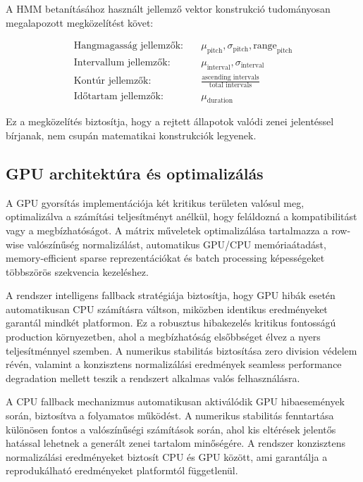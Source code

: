A HMM betanításához használt jellemző vektor konstrukció tudományosan megalapozott megközelítést követ:

\begin{align}
\text{Hangmagasság jellemzők:} \quad &\mu_{\text{pitch}}, \sigma_{\text{pitch}}, \text{range}_{\text{pitch}} \\
\text{Intervallum jellemzők:} \quad &\mu_{\text{interval}}, \sigma_{\text{interval}} \\
\text{Kontúr jellemzők:} \quad &\frac{\text{ascending intervals}}{\text{total intervals}} \\
\text{Időtartam jellemzők:} \quad &\mu_{\text{duration}}
\end{align}

Ez a megközelítés biztosítja, hogy a rejtett állapotok valódi zenei jelentéssel bírjanak, nem csupán matematikai konstrukciók legyenek.

\subsection{GPU architektúra és optimalizálás}

A GPU gyorsítás implementációja két kritikus területen valósul meg, optimalizálva a számítási teljesítményt anélkül, hogy feláldozná a kompatibilitást vagy a megbízhatóságot. A mátrix műveletek optimalizálása tartalmazza a row-wise valószínűség normalizálást, automatikus GPU/CPU memóriaátadást, memory-efficient sparse reprezentációkat és batch processing képességeket többszörös szekvencia kezeléshez.

A rendszer intelligens fallback stratégiája biztosítja, hogy GPU hibák esetén automatikusan CPU számításra váltson, miközben identikus eredményeket garantál mindkét platformon. Ez a robusztus hibakezelés kritikus fontosságú production környezetben, ahol a megbízhatóság elsőbbséget élvez a nyers teljesítménnyel szemben. A numerikus stabilitás biztosítása zero division védelem révén, valamint a konzisztens normalizálási eredmények seamless performance degradation mellett teszik a rendszert alkalmas valós felhasználásra.

A CPU fallback mechanizmus automatikusan aktiválódik GPU hibaesemények során, biztosítva a folyamatos működést. A numerikus stabilitás fenntartása különösen fontos a valószínűségi számítások során, ahol kis eltérések jelentős hatással lehetnek a generált zenei tartalom minőségére. A rendszer konzisztens normalizálási eredményeket biztosít CPU és GPU között, ami garantálja a reprodukálható eredményeket platformtól függetlenül.

